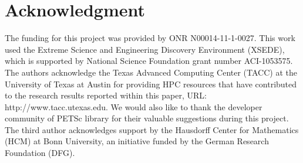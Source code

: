 \section*{Acknowledgment} 
The funding for this project was provided by ONR N00014-11-1-0027. This work used the Extreme Science and Engineering Discovery Environment (XSEDE), which is supported by National Science Foundation grant number
ACI-1053575. The authors acknowledge the Texas Advanced Computing
Center (TACC) at the University of Texas at Austin for providing HPC resources that have contributed to the research results reported within this paper, URL: http://www.tacc.utexas.edu. We would also like to thank the developer community of PETSc library for their valuable
suggestions during this project.
The third author acknowledges support by the Hausdorff Center for Mathematics
(HCM) at Bonn University,
an initiative funded by the German Research Foundation (DFG).
